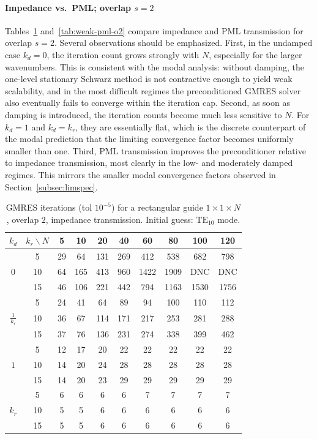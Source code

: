\documentclass[smallextended]{svjour3}       %
\begin{document}
\paragraph{Impedance vs.\ PML; overlap \(s=2\)}
Tables~\ref{tab:weak-imp-o2} and~\ref{tab:weak-pml-o2} compare impedance and PML transmission for
overlap \(s=2\). Several observations should be emphasized. First, in the undamped case \(k_d=0\), the iteration count grows strongly with \(N\), especially
for the larger wavenumbers. This is consistent with the modal analysis: without damping, the
one-level stationary Schwarz method is not contractive enough to yield weak scalability, and in
the most difficult regimes the preconditioned GMRES solver also eventually fails to converge within
the iteration cap. Second, as soon as damping is introduced, the iteration counts become much less sensitive to
\(N\). For \(k_d=1\) and \(k_d=k_r\), they are essentially flat, which is the discrete
counterpart of the modal prediction that the limiting convergence factor becomes uniformly smaller
than one. Third, PML transmission improves the preconditioner relative to impedance transmission, most
clearly in the low- and moderately damped regimes. This mirrors the smaller modal convergence
factors observed in Section~\ref{subsec:limspec}.

\begin{table}[h]
\centering
\setlength{\tabcolsep}{3pt}
\renewcommand{\arraystretch}{1.05}
\caption{GMRES iterations (tol \(10^{-5}\)) for a rectangular guide \(1\times 1\times N\), overlap \(2\),
impedance transmission. Initial guess: $\mathrm{TE}_{10}$ mode.}
\label{tab:weak-imp-o2}
\begin{tabular}{|c||c|c|c|c|c|c|c|c|c|}
\hline
$k_d$ & $ k_r \backslash N$ & 5 & 10 & 20 & 40 & 60 & 80 & 100 & 120 \\
\hline
 & 5 & 29 & 64 & 131 & 269 & 412 & 538 & 682 & 798 \\
$0$ & 10 & 64 & 165 & 413 & 960 & 1422 & 1909 & DNC & DNC \\
 & 15 & 46 & 106 & 221 & 442 & 794 & 1163 & 1530 & 1756 \\
\hline\hline
 & 5 & 24 & 41 & 64 & 89 & 94 & 100 & 110 & 112 \\
$\frac{1}{k_r}$ & 10 & 36 & 67 & 114 & 171 & 217 & 253 & 281 & 288 \\
 & 15 & 37 & 76 & 136 & 231 & 274 & 338 & 399 & 462 \\
\hline\hline
 & 5 & 12 & 17 & 20 & 22 & 22 & 22 & 22 & 22 \\
$1$ & 10 & 14 & 20 & 24 & 28 & 28 & 28 & 28 & 28 \\
 & 15 & 14 & 20 & 23 & 29 & 29 & 29 & 29 & 29 \\
\hline\hline
 & 5 & 6 & 6 & 6 & 6 & 7 & 7 & 7 & 7 \\
$k_r$ & 10 & 5 & 5 & 6 & 6 & 6 & 6 & 6 & 6 \\
 & 15 & 5 & 5 & 6 & 6 & 6 & 6 & 6 & 6 \\
\hline
\end{tabular}
\end{table}
\end{document}
